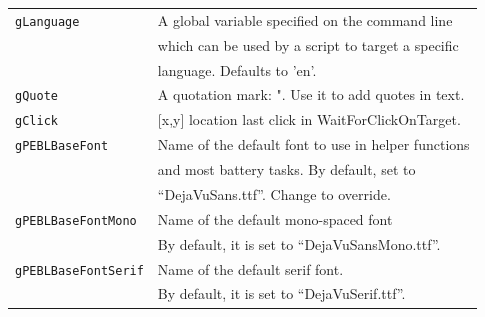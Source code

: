 \begin{table}[htbp]
\begin{tabular}{ll}
\verb+gLanguage+   & A global variable specified on the command line\\
&which can be used by a script to target a specific \\
&language.  Defaults to 'en'.\\
\verb+gQuote+ &A quotation mark: ".  Use it to add quotes in text.\\
\verb+gClick+ &[x,y] location last click in WaitForClickOnTarget.\\
\verb+gPEBLBaseFont+& Name of the default font to use in helper functions\\
                    &and most battery tasks. By default, set to \\
                    &``DejaVuSans.ttf''. Change to  override.\\
\verb+gPEBLBaseFontMono+&Name of the default mono-spaced font\\
&  By default, it is set to ``DejaVuSansMono.ttf''. \\
\verb+gPEBLBaseFontSerif+&Name of the default serif font.\\
& By default, it is set to ``DejaVuSerif.ttf''.\\

\bottomrule
\end{tabular}
\label{tab:special}
\end{table}






